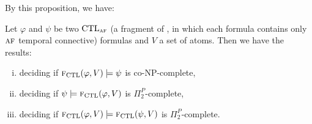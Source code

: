 \documentclass{article}
\begin{document}
By this proposition, we have:
\begin{theorem}\label{thm:comF}
Let $\varphi$ and $\psi$ be two $\textrm{CTL}_{\textsc{a} \textsc{f}}$ (a fragment of \CTL, in which each formula contains only $\textsc{a} \textsc{f}$ temporal connective) formulas and $V$ a set of atoms. Then we have the
results:
\begin{enumerate}[(i)]
  \item deciding if ${\textsc{f}_{\textrm{CTL}}}(\varphi, V ) \models \psi$ is co-NP-complete,
  \item deciding if $\psi \models {\textsc{f}_{\textrm{CTL}}}(\varphi, V)$ is $\Pi_2^P$-complete,
  \item deciding if ${\textsc{f}_{\textrm{CTL}}}(\varphi, V) \models {\textsc{f}_{\textrm{CTL}}}(\psi, V)$ is $\Pi_2^P$-complete.
\end{enumerate}
\end{theorem}
%
\end{document}
